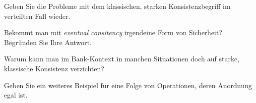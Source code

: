 \begin{fragen}
	\item Geben Sie die Probleme mit dem klassischen, starken Konsistenzbegriff im verteilten Fall wieder.
	\item Bekommt man mit \emph{eventual consitency} irgendeine Form von Sicherheit? Begründen Sie Ihre Antwort.
	\item Warum kann man im Bank-Kontext in manchen Situationen doch auf starke, klassische Konsistenz verzichten?
	\item Geben Sie ein weiteres Beispiel für eine Folge von Operationen, deren Anordnung egal ist.
\end{fragen}